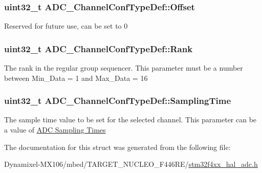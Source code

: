 \subsubsection[{\texorpdfstring{Offset}{Offset}}]{\setlength{\rightskip}{0pt plus 5cm}uint32\+\_\+t A\+D\+C\+\_\+\+Channel\+Conf\+Type\+Def\+::\+Offset}\hypertarget{struct_a_d_c___channel_conf_type_def_a481e92707be00870f495e8a63c6cc788}{}\label{struct_a_d_c___channel_conf_type_def_a481e92707be00870f495e8a63c6cc788}
Reserved for future use, can be set to 0 
\subsubsection[{\texorpdfstring{Rank}{Rank}}]{\setlength{\rightskip}{0pt plus 5cm}uint32\+\_\+t A\+D\+C\+\_\+\+Channel\+Conf\+Type\+Def\+::\+Rank}\hypertarget{struct_a_d_c___channel_conf_type_def_a106e52a928aefb7778802bac0b75cf2d}{}\label{struct_a_d_c___channel_conf_type_def_a106e52a928aefb7778802bac0b75cf2d}
The rank in the regular group sequencer. This parameter must be a number between Min\+\_\+\+Data = 1 and Max\+\_\+\+Data = 16 
\subsubsection[{\texorpdfstring{Sampling\+Time}{SamplingTime}}]{\setlength{\rightskip}{0pt plus 5cm}uint32\+\_\+t A\+D\+C\+\_\+\+Channel\+Conf\+Type\+Def\+::\+Sampling\+Time}\hypertarget{struct_a_d_c___channel_conf_type_def_ae9486a657d515b87e2c2853db59afaaa}{}\label{struct_a_d_c___channel_conf_type_def_ae9486a657d515b87e2c2853db59afaaa}
The sample time value to be set for the selected channel. This parameter can be a value of \hyperlink{group___a_d_c__sampling__times}{A\+DC Sampling Times} 

The documentation for this struct was generated from the following file\+:\begin{DoxyCompactItemize}
\item 
Dynamixel-\/\+M\+X106/mbed/\+T\+A\+R\+G\+E\+T\+\_\+\+N\+U\+C\+L\+E\+O\+\_\+\+F446\+R\+E/\hyperlink{stm32f4xx__hal__adc_8h}{stm32f4xx\+\_\+hal\+\_\+adc.\+h}\end{DoxyCompactItemize}
